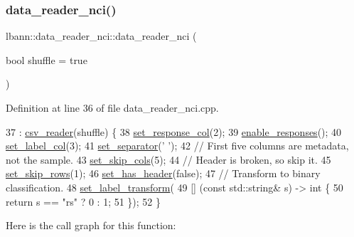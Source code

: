 \subsubsection{\texorpdfstring{data\+\_\+reader\+\_\+nci()}{data\_reader\_nci()}\hspace{0.1cm}{\footnotesize\ttfamily [1/3]}}
{\footnotesize\ttfamily lbann\+::data\+\_\+reader\+\_\+nci\+::data\+\_\+reader\+\_\+nci (\begin{DoxyParamCaption}\item[{bool}]{shuffle = {\ttfamily true} }\end{DoxyParamCaption})}



Definition at line 36 of file data\+\_\+reader\+\_\+nci.\+cpp.


\begin{DoxyCode}
37   : \hyperlink{classlbann_1_1csv__reader_ac301a4c8e2ef029b65e8f6b8cbbc5855}{csv\_reader}(shuffle) \{
38   \hyperlink{classlbann_1_1csv__reader_aed2d76ec0f0a338047a4d15fc43413fb}{set\_response\_col}(2);
39   \hyperlink{classlbann_1_1csv__reader_a7f2f980b860939e561d669575da9fb49}{enable\_responses}();
40   \hyperlink{classlbann_1_1csv__reader_ad21bef8b7e1c1f9a03724475f987580c}{set\_label\_col}(3);
41   \hyperlink{classlbann_1_1csv__reader_a58c71a6b3a82c064b349ae9d995bcffc}{set\_separator}(\textcolor{charliteral}{' '});
42   \textcolor{comment}{// First five columns are metadata, not the sample.}
43   \hyperlink{classlbann_1_1csv__reader_a1ab853e9c9a37a1e6c51811bf5be421b}{set\_skip\_cols}(5);
44   \textcolor{comment}{// Header is broken, so skip it.}
45   \hyperlink{classlbann_1_1csv__reader_a7ec75f9bbf61073dd205871916578125}{set\_skip\_rows}(1);
46   \hyperlink{classlbann_1_1csv__reader_abc40f1b5848b1dcaf72cd1b84196c78e}{set\_has\_header}(\textcolor{keyword}{false});
47   \textcolor{comment}{// Transform to binary classification.}
48   \hyperlink{classlbann_1_1csv__reader_afa41685e0d81ab1b2b8e8739c94873cc}{set\_label\_transform}(
49     [] (\textcolor{keyword}{const} std::string& s) -> \textcolor{keywordtype}{int} \{
50       \textcolor{keywordflow}{return} s == \textcolor{stringliteral}{"rs"} ? 0 : 1;
51     \});
52 \}
\end{DoxyCode}
Here is the call graph for this function\+:\nopagebreak
